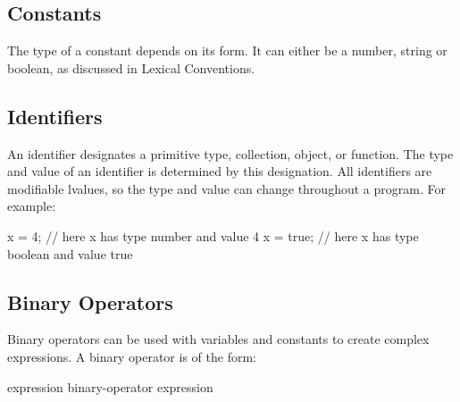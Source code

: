 \documentclass[oneside]{book}
\begin{document}
\subsection{Constants}

The type of a constant depends on its form. It can either be a number, string or boolean, as discussed in Lexical Conventions.

\subsection{Identifiers}

An identifier designates a primitive type, collection, object, or function. The type and value of an identifier is determined by this designation. All identifiers are modifiable lvalues, so the type and value can change throughout a program. For example:
\begin{mdframed}
[hidealllines=true,backgroundcolor=gray!10,skipbelow=.5em,skipabove=.5em]
\begin{code}
x = 4;
// here x has type number and value 4
x = true;
// here x has type boolean and value true
\end{code}
\end{mdframed}

\subsection{Binary Operators}

Binary operators can be used with variables and constants to create complex expressions. A binary operator is of the form:
\begin{code}
expression binary-operator expression
\end{code}
\end{document}
